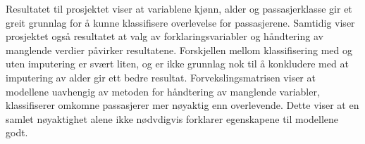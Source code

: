 Resultatet til prosjektet viser at variablene kjønn, alder og passasjerklasse gir et greit grunnlag for å kunne klassifisere overlevelse for passasjerene. Samtidig viser prosjektet også resultatet at valg av forklaringsvariabler og håndtering av manglende verdier påvirker resultatene. Forskjellen mellom klassifisering med og uten imputering er svært liten, og er ikke grunnlag nok til å konkludere med at imputering av alder gir ett bedre resultat. Forvekslingsmatrisen viser at modellene uavhengig av metoden for håndtering av manglende variabler, klassifiserer omkomne passasjerer mer nøyaktig enn overlevende. Dette viser at en samlet nøyaktighet alene ikke nødvdigvis forklarer egenskapene til modellene godt. 

